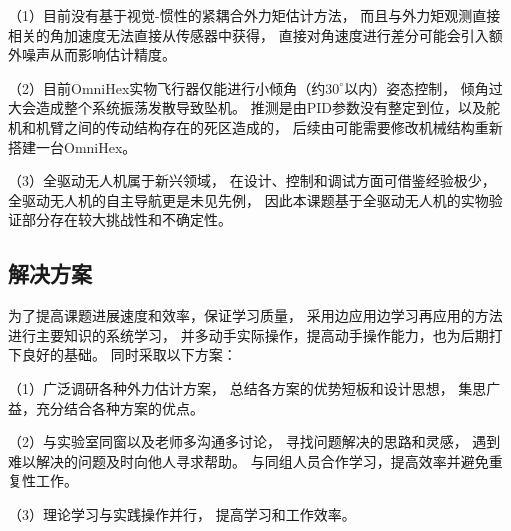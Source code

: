 （1）目前没有基于视觉-惯性的紧耦合外力矩估计方法，
而且与外力矩观测直接相关的角加速度无法直接从传感器中获得，
直接对角速度进行差分可能会引入额外噪声从而影响估计精度。

（2）目前OmniHex实物飞行器仅能进行小倾角（约$30^\circ$以内）姿态控制，
倾角过大会造成整个系统振荡发散导致坠机。
推测是由PID参数没有整定到位，以及舵机和机臂之间的传动结构存在的死区造成的，
后续由可能需要修改机械结构重新搭建一台OmniHex。

（3）全驱动无人机属于新兴领域，
在设计、控制和调试方面可借鉴经验极少，
全驱动无人机的自主导航更是未见先例，
因此本课题基于全驱动无人机的实物验证部分存在较大挑战性和不确定性。

\subsection{解决方案}
为了提高课题进展速度和效率，保证学习质量，
采用边应用边学习再应用的方法进行主要知识的系统学习，
并多动手实际操作，提高动手操作能力，也为后期打下良好的基础。
同时采取以下方案：

（1）广泛调研各种外力估计方案，
总结各方案的优势短板和设计思想，
集思广益，充分结合各种方案的优点。

（2）与实验室同窗以及老师多沟通多讨论，
寻找问题解决的思路和灵感，
遇到难以解决的问题及时向他人寻求帮助。
与同组人员合作学习，提高效率并避免重复性工作。

（3）理论学习与实践操作并行，
提高学习和工作效率。




